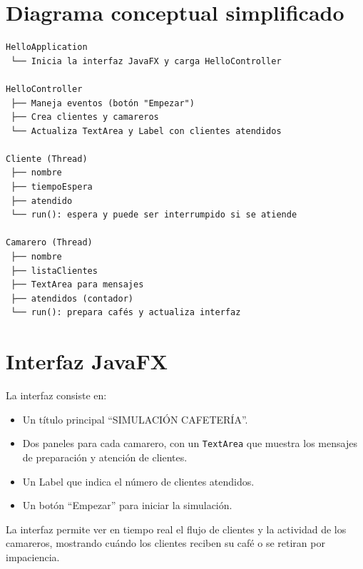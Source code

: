 \documentclass{article}
\begin{document}
\section{Diagrama conceptual simplificado}

\begin{verbatim}
HelloApplication
 └── Inicia la interfaz JavaFX y carga HelloController

HelloController
 ├── Maneja eventos (botón "Empezar")
 ├── Crea clientes y camareros
 └── Actualiza TextArea y Label con clientes atendidos

Cliente (Thread)
 ├── nombre
 ├── tiempoEspera
 ├── atendido
 └── run(): espera y puede ser interrumpido si se atiende

Camarero (Thread)
 ├── nombre
 ├── listaClientes
 ├── TextArea para mensajes
 ├── atendidos (contador)
 └── run(): prepara cafés y actualiza interfaz
\end{verbatim}

\section{Interfaz JavaFX}
La interfaz consiste en:

\begin{itemize}
    \item Un título principal “SIMULACIÓN CAFETERÍA”.
    \item Dos paneles para cada camarero, con un \texttt{TextArea} que muestra los mensajes de preparación y atención de clientes.
    \item Un Label que indica el número de clientes atendidos.
    \item Un botón “Empezar” para iniciar la simulación.
\end{itemize}

La interfaz permite ver en tiempo real el flujo de clientes y la actividad de los camareros, mostrando cuándo los clientes reciben su café o se retiran por impaciencia.

\end{document}
